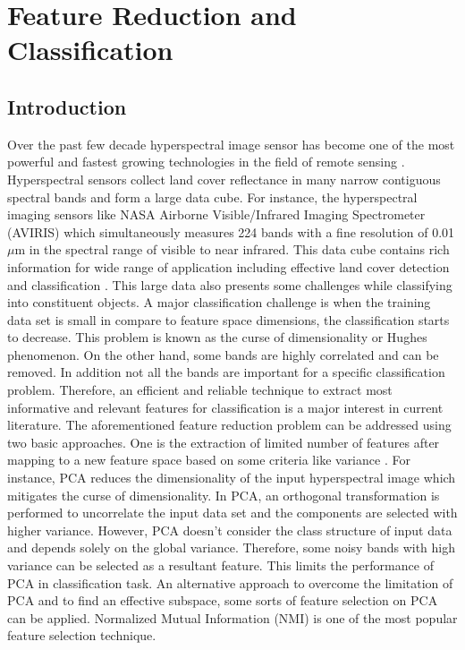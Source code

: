 \documentclass[document.tex]{subfiles}
\begin{document}
\chapter{Feature Reduction and Classification}
\section{Introduction}
\noindent Over the past few decade hyperspectral image sensor
has become one of the most powerful and fastest growing technologies in the field of remote sensing \cite{3}. Hyperspectral sensors collect land cover reflectance in many narrow contiguous spectral bands and form a large data cube\cite{3}. For instance, the hyperspectral imaging sensors like NASA Airborne Visible/Infrared Imaging
Spectrometer (AVIRIS) which simultaneously measures 224 bands with a fine resolution of 0.01 $\mu$m in the spectral range of visible to near infrared. This data cube contains rich information for wide range of application including effective land cover detection and classification \cite{24}. This large data also presents some challenges while classifying into constituent objects. A major classification challenge is when the training data set is small in compare to feature space dimensions, the classification starts to decrease. This problem is known as the curse of dimensionality or Hughes phenomenon\cite{4}\cite{25}\cite{26}. On the other hand, some bands are highly correlated and can be removed. In addition not all the bands are important for a specific classification problem. Therefore, an efficient and reliable technique to extract most informative and relevant features for classification is a major interest in current literature. The aforementioned feature reduction problem can be addressed using two basic approaches\cite{2}. One is the extraction of limited number of features after mapping to a new feature space based on some criteria like variance \cite{27,28}\cite{8}\cite{7}. For instance, PCA reduces the dimensionality of the input hyperspectral image which mitigates the curse of dimensionality. In PCA, an orthogonal transformation is performed to uncorrelate the input data set and the components are selected with higher variance. However, PCA doesn't consider the class structure of input data and depends solely on the global variance. Therefore, some noisy bands with high variance can be selected as a resultant feature. This limits the performance of PCA in classification task. An alternative approach to overcome the limitation of PCA and to find an effective subspace, some sorts of feature selection on PCA can be applied\cite{34}. Normalized Mutual Information (NMI) is one of the most popular feature selection technique\cite{9,10,20}.
\end{document}
